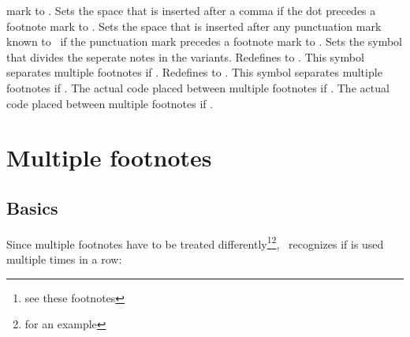 \documentclass{fnpct-manual}
\begin{document}
\begin{options}
    mark to .
  \Default{-.06em}
    Sets the space that is inserted after a comma if the dot precedes a
    footnote mark to .
    Sets the space that is inserted after any punctuation mark known to
    \fnpct\ if the punctuation mark precedes a footnote mark to
    .
  \Default{\code{;}}
    Sets the symbol that divides the seperate notes in the 
    variants.
    Redefines  to .  This symbol separates
    multiple footnotes if .
  \Default{\code{--}}
    Redefines  to .  This symbol separates
    multiple footnotes if .
    The actual code placed between multiple footnotes if .
    The actual code placed between multiple footnotes if .
\end{options}



\section{Multiple footnotes}\label{sec:multiple}
\subsection{Basics}
Since multiple footnotes have to be treated differently\footnote{see these
  footnotes}\footnote{for an example}, \fnpct\ recognizes if  is
used multiple times in a row:
\end{document}
